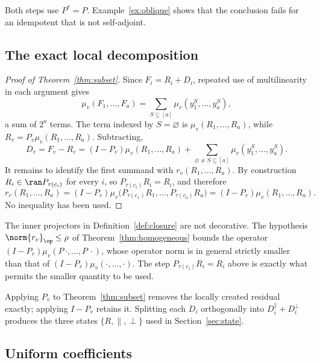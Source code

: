 Both steps use $P^*=P$. Example~\ref{ex:oblique} shows that the conclusion fails for an
idempotent that is not self-adjoint.

\subsection{The exact local decomposition}

\begin{proof}[Proof of Theorem~\ref{thm:subset}]
Since $F_i=R_i+D_i$, repeated use of multilinearity in each argument gives
\[
 \mu_v(F_1,\ldots,F_a)
 =\sum_{S\subseteq[a]}\mu_v(y_1^S,\ldots,y_a^S),
\]
a sum of $2^a$ terms. The term indexed by $S=\varnothing$ is
$\mu_v(R_1,\ldots,R_a)$, while $R_v=P_v\mu_v(R_1,\ldots,R_a)$. Subtracting,
\[
 D_v
 =F_v-R_v
 =(I-P_v)\mu_v(R_1,\ldots,R_a)
 +\sum_{\varnothing\ne S\subseteq[a]}\mu_v(y_1^S,\ldots,y_a^S).
\]
It remains to identify the first summand with $r_v(R_1,\ldots,R_a)$. By construction
$R_i\in\ran P_{\tau(c_i)}$ for every $i$, so $P_{\tau(c_i)}R_i=R_i$, and therefore
\[
 r_v(R_1,\ldots,R_a)
 =(I-P_v)\mu_v\bigl(P_{\tau(c_1)}R_1,\ldots,P_{\tau(c_a)}R_a\bigr)
 =(I-P_v)\mu_v(R_1,\ldots,R_a).
\]
No inequality has been used.
\end{proof}

\begin{remark}
\label{rem:innerprojectors}
The inner projectors in Definition~\ref{def:closure} are not decorative. The hypothesis
$\norm{r_v}_\op\le\rho$ of Theorem~\ref{thm:homogeneous} bounds the operator
$(I-P_v)\mu_v(P\,\cdot,\ldots,P\,\cdot)$, whose operator norm is in general strictly
smaller than that of $(I-P_v)\mu_v(\cdot,\ldots,\cdot)$. The step
$P_{\tau(c_i)}R_i=R_i$ above is exactly what permits the smaller quantity to be used.
\end{remark}

Applying $P_v$ to Theorem~\ref{thm:subset} removes the locally created residual exactly;
applying $I-P_v$ retains it. Splitting each $D_i$ orthogonally into
$D_i^{\parallel}+D_i^{\perp}$ produces the three states $\{R,\parallel,\perp\}$ used in
Section~\ref{sec:state}.

\subsection{Uniform coefficients}

